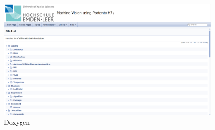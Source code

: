 \documentclass[12pt,a4paper]{scrbook}
\begin{document}
\begin{figure}
	\begin{center}
		\includegraphics[width=0.7\linewidth]{Images/EdgeImpulse/Doxygen.png}
		\caption{Doxygen}
		\label{Doxygen}
	\end{center}
\end{figure}

\cleardoublepage
{}
\printbibliography

\cleardoublepage

\printindex
\end{document}
